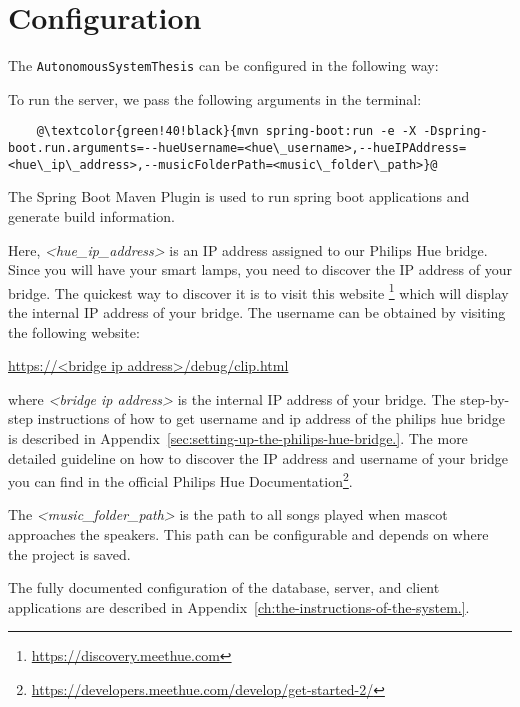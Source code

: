 \section{Configuration}
\label{sec:configuration}
The \texttt{AutonomousSystemThesis} can be configured in the following way:

To run the server, we pass the following arguments in the terminal:
\begin{lstlisting}
    @\textcolor{green!40!black}{mvn spring-boot:run -e -X -Dspring-boot.run.arguments=--hueUsername=<hue\_username>,--hueIPAddress=<hue\_ip\_address>,--musicFolderPath=<music\_folder\_path>}@
\end{lstlisting}

The Spring Boot Maven Plugin is used to run spring boot applications and generate build information.

Here, \emph{<hue\_ip\_address>} is an IP address assigned to our Philips Hue bridge.
Since you will have your smart lamps, you need to discover the IP address of your bridge.
The quickest way to discover it is to visit this website \footnote{\url{https://discovery.meethue.com}} which
will display the internal IP address of your bridge.
The username can be obtained by visiting the following website:

\url{https://<bridge ip address>/debug/clip.html}

where \emph{<bridge ip address>} is the internal IP address of your bridge.
The step-by-step instructions of how to get username and ip address of the philips hue bridge is described in
Appendix~\ref{sec:setting-up-the-philips-hue-bridge.}.
The more detailed guideline on how to discover the IP address and username of your bridge you can
find in the official Philips Hue Documentation\footnote{\url{https://developers.meethue.com/develop/get-started-2/}}.

The \emph{<music\_folder\_path>} is the path to all songs played when mascot approaches the speakers.
This path can be configurable and depends on where the project is saved.

The fully documented configuration of the database, server, and client applications are described in
Appendix~\ref{ch:the-instructions-of-the-system.}.

